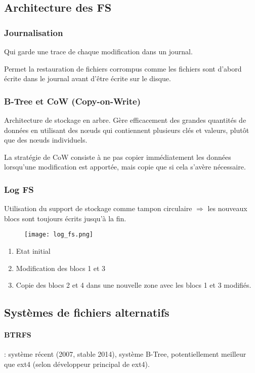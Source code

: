 \subsection{Architecture des FS}
\subsubsection{Journalisation}
Qui garde une trace de chaque modification dans un journal.

Permet la restauration de fichiers corrompus comme les fichiers sont d'abord écrite dans le journal avant d'être écrite sur le disque.
\subsubsection{B-Tree et CoW (Copy-on-Write)}
Architecture de stockage en arbre. Gère efficacement des grandes quantités de données en utilisant des nœuds qui contiennent plusieurs clés et valeurs, plutôt que des nœuds individuels.

La stratégie de CoW consiste à ne pas copier immédiatement les données lorsqu'une modification est apportée, mais copie que si cela s'avère nécessaire.
\subsubsection{Log FS}
Utilisation du support de stockage comme tampon circulaire $\Rightarrow$ les nouveaux blocs sont toujours écrits jusqu'à la fin.

\begin{figure}[H]
    \centering
    \texttt{[image: log\_fs.png]}
    \label{fig:log_fs}
\end{figure}
\begin{enumerate}
    \item Etat initial
    \item Modification des blocs 1 et 3
    \item Copie des blocs 2 et 4 dans une nouvelle zone avec les blocs 1 et 3 modifiés.
\end{enumerate}
\subsection{Systèmes de fichiers alternatifs}
\paragraph{BTRFS} : système récent (2007, stable 2014), système B-Tree, potentiellement meilleur que ext4 (selon développeur principal de ext4).

